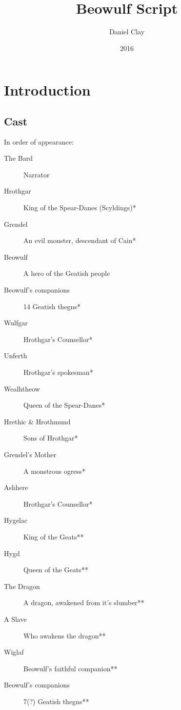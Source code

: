 \documentclass[a4paper]{article}
\begin{document}
\title{Beowulf Script}
\date{2016}
\author{
Daniel Clay \\ 
}
\maketitle

\section{Introduction}

\subsection{Cast}%

In order of appearance:
\begin{description}
    \item[The Bard] Narrator
    \item[Hrothgar] King of the Spear-Danes (Scyldings)*
    \item[Grendel] An evil monster, descendant of Cain*
    \item[Beowulf] A hero of the Geatish people
    \item[Beowulf's companions] 14 Geatish thegns*
    \item[Wulfgar] Hrothgar's Counsellor*
    \item[Unferth] Hrothgar's spokesman*
    \item[Wealhtheow] Queen of the Spear-Danes*
    \item[Hrethic \& Hrothmund] Sons of Hrothgar*
    \item[Grendel's Mother] A monstrous ogress*
    \item[Ashhere] Hrothgar's Counsellor*
    \item[Hygelac] King of the Geats**
    \item[Hygd] Queen of the Geats**
    \item[The Dragon] A dragon, awakened from it's slumber**
    \item[A Slave] Who awakens the dragon**
    \item[Wiglaf] Beowulf's faithful companion**
    \item[Beowulf's companions] 7(?) Geatish thegns**
\end{description}
\end{document}
